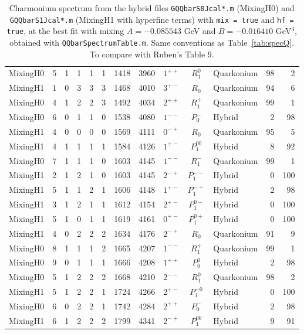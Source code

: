 \documentclass[11pt, a4paper]{article}
\begin{document}
\begin{table}[p]
\begin{tabular}{l r r r r r r r c c l r r}
\rowcolor{cyan!12} MixingH0 & 5 & 1 & 1 & 1 & 1 & 1418 & 3960 & $1^{++}$ & $R_1^{0}$ & Quarkonium & 98 & 2 \\
\rowcolor{cyan!12} MixingH1 & 1 & 0 & 3 & 3 & 3 & 1468 & 4010 & $3^{+-}$ & $R_0$ & Quarkonium & 94 & 6 \\
\rowcolor{cyan!12} MixingH0 & 4 & 1 & 2 & 2 & 3 & 1492 & 4034 & $2^{++}$ & $R_1^{+}$ & Quarkonium & 99 & 1 \\
\rowcolor{red!12} MixingH0 & 6 & 0 & 1 & 1 & 0 & 1538 & 4080 & $1^{--}$ & $P_0^{-}$ & Hybrid & 2 & 98 \\
\rowcolor{cyan!12} MixingH1 & 4 & 0 & 0 & 0 & 0 & 1569 & 4111 & $0^{-+}$ & $R_0$ & Quarkonium & 95 & 5 \\
\rowcolor{red!12} MixingH1 & 4 & 1 & 1 & 1 & 1 & 1584 & 4126 & $1^{+-}$ & $P_1^{00}$ & Hybrid & 8 & 92 \\
\rowcolor{cyan!12} MixingH0 & 7 & 1 & 1 & 1 & 0 & 1603 & 4145 & $1^{--}$ & $R_1^{-}$ & Quarkonium & 99 & 1 \\
\rowcolor{red!12} MixingH1 & 2 & 1 & 2 & 1 & 0 & 1603 & 4145 & $2^{-+}$ & $P_1^{--}$ & Hybrid & 0 & 100 \\
\rowcolor{red!12} MixingH1 & 5 & 1 & 1 & 2 & 1 & 1606 & 4148 & $1^{+-}$ & $P_1^{-+}$ & Hybrid & 2 & 98 \\
\rowcolor{red!12} MixingH1 & 3 & 1 & 2 & 1 & 1 & 1612 & 4154 & $2^{+-}$ & $P_1^{0-}$ & Hybrid & 0 & 100 \\
\rowcolor{red!12} MixingH1 & 5 & 1 & 0 & 1 & 1 & 1619 & 4161 & $0^{+-}$ & $P_1^{0+}$ & Hybrid & 0 & 100 \\
\rowcolor{cyan!12} MixingH1 & 4 & 0 & 2 & 2 & 2 & 1634 & 4176 & $2^{-+}$ & $R_0$ & Quarkonium & 91 & 9 \\
\rowcolor{cyan!12} MixingH0 & 8 & 1 & 1 & 1 & 2 & 1665 & 4207 & $1^{--}$ & $R_1^{+}$ & Quarkonium & 99 & 1 \\
\rowcolor{red!12} MixingH0 & 9 & 0 & 1 & 1 & 1 & 1666 & 4208 & $1^{++}$ & $P_0^{0}$ & Hybrid & 2 & 98 \\
\rowcolor{cyan!12} MixingH0 & 5 & 1 & 2 & 2 & 2 & 1668 & 4210 & $2^{--}$ & $R_1^{0}$ & Quarkonium & 98 & 2 \\
\rowcolor{red!12} MixingH1 & 5 & 1 & 2 & 2 & 1 & 1724 & 4266 & $2^{+-}$ & $P_1^{-0}$ & Hybrid & 0 & 100 \\
\rowcolor{red!12} MixingH0 & 6 & 0 & 2 & 2 & 1 & 1742 & 4284 & $2^{++}$ & $P_0^{-}$ & Hybrid & 2 & 98 \\
\rowcolor{red!12} MixingH1 & 6 & 1 & 2 & 2 & 2 & 1799 & 4341 & $2^{-+}$ & $P_1^{00}$ & Hybrid & 9 & 91 \\
\bottomrule
\end{tabular}
\caption{\small Charmonium spectrum from the hybrid files \texttt{GQQbarS0Jcal*.m} (MixingH0) and \texttt{GQQbarS1Jcal*.m} (MixingH1 with hyperfine terms) with \texttt{mix = true} and \texttt{hf = true}, at the best fit with mixing $A=-0.085543$ GeV and $B=-0.016410$ GeV$^3$, obtained with \texttt{QQbarSpectrumTable.m}. Same conventions as Table~\ref{tab:specQ}. To compare with Ruben's Table 9.}
\label{tab:specH}
\end{table}
\end{document}
